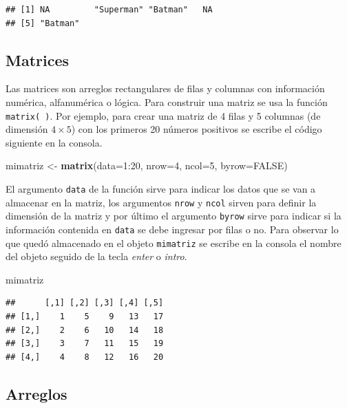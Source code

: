 \documentclass[10pt,]{krantz}
\makeatletter
\newenvironment{Shaded}{\begin{snugshade}}{\end{snugshade}}
\newcommand{\KeywordTok}[1]{\textcolor[rgb]{0.13,0.29,0.53}{\textbf{{#1}}}}
\newcommand{\DataTypeTok}[1]{\textcolor[rgb]{0.13,0.29,0.53}{{#1}}}
\newcommand{\DecValTok}[1]{\textcolor[rgb]{0.00,0.00,0.81}{{#1}}}
\newcommand{\StringTok}[1]{\textcolor[rgb]{0.31,0.60,0.02}{{#1}}}
\newcommand{\OtherTok}[1]{\textcolor[rgb]{0.56,0.35,0.01}{{#1}}}
\newcommand{\NormalTok}[1]{{#1}}
\newenvironment{kframe}{%
\medskip{}
\setlength{\fboxsep}{.8em}
 \def\at@end@of@kframe{}%
 \ifinner\ifhmode%
  \def\at@end@of@kframe{\end{minipage}}%
  \begin{minipage}{\columnwidth}%
 \fi\fi%
 \def\FrameCommand##1{\hskip\@totalleftmargin \hskip-\fboxsep
 \colorbox{shadecolor}{##1}\hskip-\fboxsep
     \hskip-\linewidth \hskip-\@totalleftmargin \hskip\columnwidth}%
 \MakeFramed {\advance\hsize-\width
   \@totalleftmargin\z@ \linewidth\hsize
   \@setminipage}}%
 {\par\unskip\endMakeFramed%
 \at@end@of@kframe}
\renewenvironment{Shaded}{\begin{kframe}}{\end{kframe}}
\makeatother
\begin{document}
\begin{verbatim}
## [1] NA         "Superman" "Batman"   NA        
## [5] "Batman"
\end{verbatim}

\subsection{Matrices}

Las matrices  son arreglos rectangulares de filas y
columnas con información numérica, alfanumérica o lógica. Para construir
una matriz se usa la función \texttt{matrix(\ )}. Por ejemplo, para
crear una matriz de 4 filas y 5 columnas (de dimensión \(4 \times 5\))
con los primeros 20 números positivos se escribe el código siguiente en
la consola.

\begin{Shaded}
\begin{Highlighting}[]
\NormalTok{mimatriz <-}\StringTok{ }\KeywordTok{matrix}\NormalTok{(}\DataTypeTok{data=}\DecValTok{1}\NormalTok{:}\DecValTok{20}\NormalTok{, }\DataTypeTok{nrow=}\DecValTok{4}\NormalTok{, }\DataTypeTok{ncol=}\DecValTok{5}\NormalTok{, }\DataTypeTok{byrow=}\OtherTok{FALSE}\NormalTok{)}
\end{Highlighting}
\end{Shaded}

El argumento \texttt{data} de la función sirve para indicar los datos
que se van a almacenar en la matriz, los argumentos \texttt{nrow} y
\texttt{ncol} sirven para definir la dimensión de la matriz y por último
el argumento \texttt{byrow} sirve para indicar si la información
contenida en \texttt{data} se debe ingresar por filas o no. Para
observar lo que quedó almacenado en el objeto \texttt{mimatriz} se
escribe en la consola el nombre del objeto seguido de la tecla
\textit{enter} o \textit{intro}.

\begin{Shaded}
\begin{Highlighting}[]
\NormalTok{mimatriz}
\end{Highlighting}
\end{Shaded}

\begin{verbatim}
##      [,1] [,2] [,3] [,4] [,5]
## [1,]    1    5    9   13   17
## [2,]    2    6   10   14   18
## [3,]    3    7   11   15   19
## [4,]    4    8   12   16   20
\end{verbatim}

\subsection{Arreglos}
\end{document}
